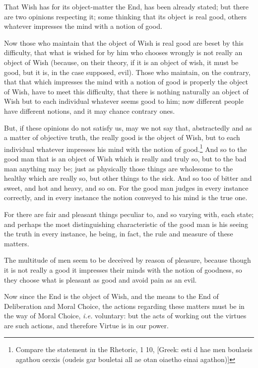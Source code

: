 
That Wish has for its object-matter the End, has been already stated; but there
are two opinions respecting it; some thinking that its object is real good,
others whatever impresses the mind with a notion of good.

Now those who maintain that the object of Wish is real good are beset by this
difficulty, that what is wished for by him who chooses wrongly is not really an
object of Wish (because, on their theory, if it is an object of wish, it must
be good, but it is, in the case supposed, evil). Those who maintain, on the
contrary, that that which impresses the mind with a notion of good is properly
the object of Wish, have to meet this difficulty, that there is nothing
naturally an object of Wish but to each individual whatever seems good to him;
now different people have different notions, and it may chance contrary ones.

But, if these opinions do not satisfy us, may we not say that, abstractedly and
as a matter of objective truth, the really good is the object of Wish, but to
each individual whatever impresses his mind with the notion of good.\footnote{Compare the statement in the Rhetoric, 1 10, [Greek: esti d hae men boulaeis
agathou orexis (oudeis gar bouletai all ae otan oiaetho einai agathon)]}
And so to the good man that is an object of Wish which is really and truly so,
but to the bad man anything may be; just as physically those things are
wholesome to the healthy which are really so, but other things to the sick. And
so too of bitter and sweet, and hot and heavy, and so on. For the good man
judges in every instance correctly, and in every instance the notion conveyed
to his mind is the true one.

For there are fair and pleasant things peculiar to, and so varying with, each
state; and perhaps the most distinguishing characteristic of the good man is
his seeing the truth in every instance, he being, in fact, the rule and measure
of these matters.

The multitude of men seem to be deceived by reason of pleasure, because though
it is not really a good it impresses their minds with the notion of goodness,
so they choose what is pleasant as good and avoid pain as an evil.


Now since the End is the object of Wish, and the means to the End of
Deliberation and Moral Choice, the actions regarding these matters must be in
the way of Moral Choice, \emph{i.e.} voluntary: but the acts of working out the
virtues are such actions, and therefore Virtue is in our power.


